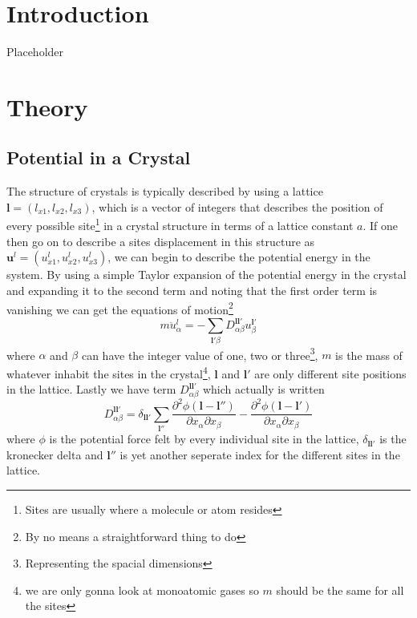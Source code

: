 \documentclass[11pt]{article}
\begin{document}
\section{Introduction}
Placeholder
\section{Theory}
\subsection{Potential in a Crystal}
The structure of crystals is typically described by using a lattice $\mathbf{l} = (l_{x1}, l_{x2}, l_{x3})$, which is a vector of integers that describes the position of every possible site\footnote{Sites are usually where a molecule or atom resides} in a crystal structure in terms of a lattice constant $a$. If one then go on to describe a sites displacement in this structure as $\mathbf{u}^l = (u^l_{x1},u^l_{x2},u^l_{x3})$, we can begin to describe the potential energy in the system. By using a simple Taylor expansion of the potential energy in the crystal and expanding it to the second term and noting that the first order term is vanishing we can get the equations of motion\footnote{By no means a straightforward thing  to do} 
\begin{equation}
	m \ddot{u}^l_{\alpha} = - \sum_{\mathbf{l}'\beta} D^{\mathbf{l}\mathbf{l}'}_{\alpha \beta} u^{\mathbf{l}'}_{\beta}
	\label{eq:motion}
\end{equation}
where $\alpha$ and $\beta$ can have the integer value of one, two or three\footnote{Representing the spacial dimensions}, $m$ is the mass of whatever inhabit the sites in the crystal\footnote{we are only gonna look at monoatomic gases so $m$ should be the same for all the sites}, $\mathbf{l}$ and $\mathbf{l}'$ are only different site positions in the lattice. Lastly we have term $D^{\mathbf{l}\mathbf{l}'}_{\alpha \beta}$ which actually is written
\begin{equation}
	D^{\mathbf{l}\mathbf{l}'}_{\alpha \beta} = \delta_{\mathbf{l} \mathbf{l}'} \sum_{\mathbf{l}''} \frac{\partial^2 \phi (\mathbf{l}-\mathbf{l}'')}{\partial x_{\alpha} \partial x_{\beta}}
	-
	\frac{\partial^2 \phi (\mathbf{l}-\mathbf{l}')}{\partial x_{\alpha} \partial x_{\beta}}
\end{equation}
where $\phi$ is the potential force felt by every individual site in the lattice, $\delta_{\mathbf{l}\mathbf{l}'}$ is the kronecker delta and $\mathbf{l}''$ is yet another seperate index for the different sites in the lattice.
\end{document}
